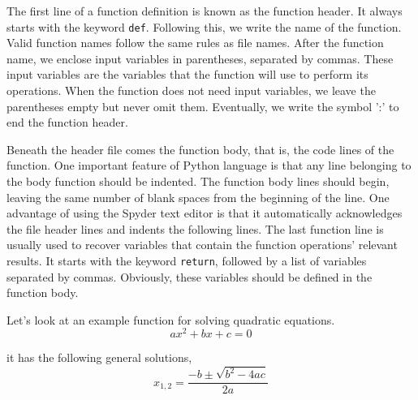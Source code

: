 \begin{paracol}{2}
The first line of a function definition is known as the function header. It always starts with the keyword \texttt{def}. Following this, we write the name of the function. Valid function names follow the same rules as file names. After the function name, we enclose input variables in parentheses, separated by commas. These input variables are the variables that the function will use to perform its operations. When the function does not need input variables, we leave the parentheses empty but never omit them. Eventually, we write the symbol ':' to end the function header.

Beneath the header file comes the function body, that is, the code lines of the function. One important feature of Python language is that any line belonging to the body function should be indented. The function body lines should begin, leaving the same number of blank spaces from the beginning of the line. One advantage of using the Spyder text editor is that it automatically acknowledges the file header lines and indents the following lines. The last function line is usually used to recover variables that contain the function operations' relevant results. It starts with the keyword \texttt{return}, followed by a list of variables separated by commas. Obviously, these variables should be defined in the function body.

Let's look at an example function for solving quadratic equations.
\begin{equation*}
ax^2+bx+c=0
\end{equation*}

it has the following general solutions,
\begin{equation*}
    x_{1,2} = \frac{-b\pm \sqrt{b^2-4ac}}{2a}
\end{equation*}
\end{paracol}

